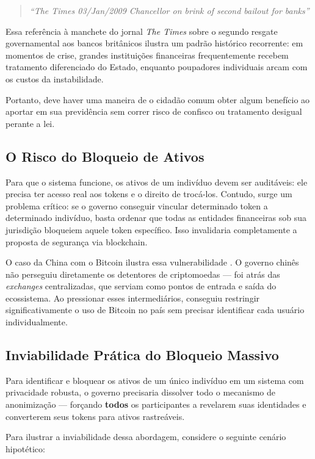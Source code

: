 \begin{quote}
    \textit{``The Times 03/Jan/2009 Chancellor on brink of second bailout for banks''}
\end{quote}

Essa referência à manchete do jornal \textit{The Times} sobre o segundo resgate governamental aos bancos britânicos ilustra um padrão histórico recorrente: em momentos de crise, grandes instituições financeiras frequentemente recebem tratamento diferenciado do Estado, enquanto poupadores individuais arcam com os custos da instabilidade.

Portanto, deve haver uma maneira de o cidadão comum obter algum benefício ao aportar em sua previdência sem correr risco de confisco ou tratamento desigual perante a lei.

\subsection{O Risco do Bloqueio de Ativos}

Para que o sistema funcione, os ativos de um indivíduo devem ser auditáveis: ele precisa ter acesso real aos tokens e o direito de trocá-los. Contudo, surge um problema crítico: se o governo conseguir vincular determinado token a determinado indivíduo, basta ordenar que todas as entidades financeiras sob sua jurisdição bloqueiem aquele token específico. Isso invalidaria completamente a proposta de segurança via blockchain.

O caso da China com o Bitcoin ilustra essa vulnerabilidade \cite{china2021}. O governo chinês não perseguiu diretamente os detentores de criptomoedas --- foi atrás das \textit{exchanges} centralizadas, que serviam como pontos de entrada e saída do ecossistema. Ao pressionar esses intermediários, conseguiu restringir significativamente o uso de Bitcoin no país sem precisar identificar cada usuário individualmente.

\subsection{Inviabilidade Prática do Bloqueio Massivo}

Para identificar e bloquear os ativos de um único indivíduo em um sistema com privacidade robusta, o governo precisaria dissolver todo o mecanismo de anonimização --- forçando \textbf{todos} os participantes a revelarem suas identidades e converterem seus tokens para ativos rastreáveis.

Para ilustrar a inviabilidade dessa abordagem, considere o seguinte cenário hipotético:

